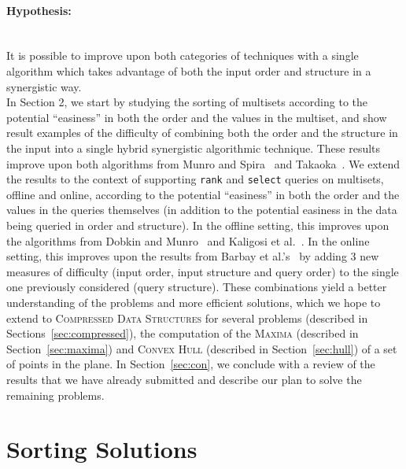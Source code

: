 
\paragraph{Hypothesis:}~\\ It is possible to improve upon both
categories of techniques with a single algorithm which takes advantage
of both the input order and structure in a synergistic way.~\\


In Section 2, we start by studying the sorting of multisets according
to the potential ``easiness'' in both the order and the values in the
multiset, and show result examples of the difficulty of combining both
the order and the structure in the input into a single hybrid
synergistic algorithmic technique.  These results improve upon both
algorithms from Munro and
Spira~\cite{1976-JComp-SortingAndSearchingInMultisets-MunroSpira} and
Takaoka~\cite{2009-Chapter-PartialSolutionAndEntropy-Takaoka}.
%
We extend the results to the context of supporting \texttt{rank} and
\texttt{select} queries on multisets, offline and online, according to
the potential ``easiness'' in both the order and the values in the
queries themselves (in addition to the potential easiness in the data
being queried in order and structure). In the offline setting, this
improves upon the algorithms from Dobkin and
Munro~\cite{1981-JACM-OptimalTimeMinimalSpaceSelectionAlgorithms-DobkinMunro}
and Kaligosi et
al.~\cite{2005-ICALP-TowardsOptimalMultopleSelection-KaligosiMehlhornMunroSanders}.
In the online setting, this improves upon the results from Barbay et
al.'s~\cite{2016-JDA-NearOptimalOnlineMultiselectionInInternalAndExternalMemory-BarbayGuptaRaoSorenson}
by adding 3 new measures of difficulty (input order, input structure
and query order) to the single one previously considered (query
structure). These combinations yield a better understanding of the
problems and more efficient solutions, which we hope to extend to
\textsc{Compressed Data Structures} for several problems (described in
Sections~\ref{sec:compressed}), the computation of the \textsc{Maxima}
(described in Section~\ref{sec:maxima}) and \textsc{Convex Hull}
(described in Section~\ref{sec:hull}) of a set of points in the
plane. In Section~\ref{sec:con}, we conclude with a review of the
results that we have already submitted and describe our plan to solve
the remaining problems.

\section{Sorting Solutions}
\label{sec:sort}

